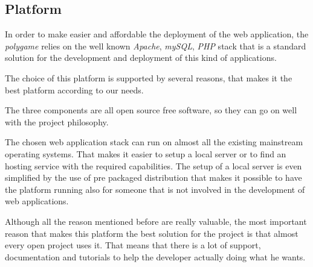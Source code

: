 \subsection{Platform}
In order to make easier and affordable the deployment of the web application, the \emph{polygame} relies on the well known \emph{Apache}, \emph{mySQL}, \emph{PHP} stack that is a standard solution for the development and deployment of this kind of applications.

The choice of this platform is supported by several reasons, that makes it the best platform according to our needs.

The three components are all open source free software, so they can go on well with the project philosophy.

The chosen web application stack can run on almost all the existing mainstream operating systems. That makes it easier to setup a local server or to find an hosting service with the required capabilities. The setup of a local server is even simplified by the use of pre packaged distribution that makes it possible to have the platform running also for someone that is not involved in the development of web applications.

Although all the reason mentioned before are really valuable, the most important reason that makes this platform the best solution for the project is that almost every open project uses it. That means that there is a lot of support, documentation and tutorials to help the developer actually doing what he wants.

\subsection{}